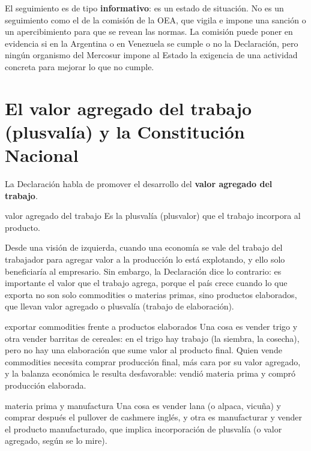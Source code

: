 \documentclass[12pt,oneside]{book}
\begin{document}
\begin{important}
El seguimiento es de tipo \textbf{informativo}: es un estado de situación. No es un seguimiento como el de la comisión de la OEA, que vigila e impone una sanción o un apercibimiento para que se revean las normas. La comisión puede poner en evidencia si en la Argentina o en Venezuela se cumple o no la Declaración, pero ningún organismo del Mercosur impone al Estado la exigencia de una actividad concreta para mejorar lo que no cumple.
\end{important}

\section{El valor agregado del trabajo (plusvalía) y la Constitución Nacional}

La Declaración habla de promover el desarrollo del \textbf{valor agregado del trabajo}.

\begin{definition}{valor agregado del trabajo}
Es la plusvalía (plusvalor) que el trabajo incorpora al producto.
\end{definition}

Desde una visión de izquierda, cuando una economía se vale del trabajo del trabajador para agregar valor a la producción lo está explotando, y ello solo beneficiaría al empresario. Sin embargo, la Declaración dice lo contrario: es importante el valor que el trabajo agrega, porque el país crece cuando lo que exporta no son solo commodities o materias primas, sino productos elaborados, que llevan valor agregado o plusvalía (trabajo de elaboración).

\begin{example}{exportar commodities frente a productos elaborados}
Una cosa es vender trigo y otra vender barritas de cereales: en el trigo hay trabajo (la siembra, la cosecha), pero no hay una elaboración que sume valor al producto final. Quien vende commodities necesita comprar producción final, más cara por su valor agregado, y la balanza económica le resulta desfavorable: vendió materia prima y compró producción elaborada.
\end{example}

\begin{example}{materia prima y manufactura}
Una cosa es vender lana (o alpaca, vicuña) y comprar después el pullover de cashmere inglés, y otra es manufacturar y vender el producto manufacturado, que implica incorporación de plusvalía (o valor agregado, según se lo mire).
\end{example}
\end{document}
